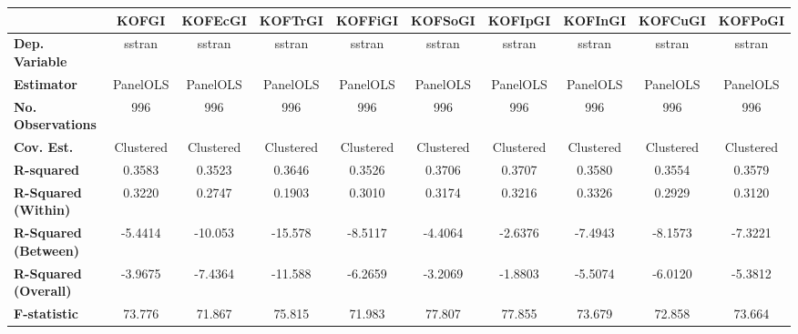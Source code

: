 \begin{center}
\begin{tabular}{lccccccccc}
\toprule
                                   & \textbf{KOFGI} & \textbf{KOFEcGI} & \textbf{KOFTrGI} & \textbf{KOFFiGI} & \textbf{KOFSoGI} & \textbf{KOFIpGI} & \textbf{KOFInGI} & \textbf{KOFCuGI} & \textbf{KOFPoGI}  \\
\midrule
\textbf{Dep. Variable}             &     sstran     &      sstran      &      sstran      &      sstran      &      sstran      &      sstran      &      sstran      &      sstran      &      sstran       \\
\textbf{Estimator}                 &    PanelOLS    &     PanelOLS     &     PanelOLS     &     PanelOLS     &     PanelOLS     &     PanelOLS     &     PanelOLS     &     PanelOLS     &     PanelOLS      \\
\textbf{No. Observations}          &      996       &       996        &       996        &       996        &       996        &       996        &       996        &       996        &       996         \\
\textbf{Cov. Est.}                 &   Clustered    &    Clustered     &    Clustered     &    Clustered     &    Clustered     &    Clustered     &    Clustered     &    Clustered     &    Clustered      \\
\textbf{R-squared}                 &     0.3583     &      0.3523      &      0.3646      &      0.3526      &      0.3706      &      0.3707      &      0.3580      &      0.3554      &      0.3579       \\
\textbf{R-Squared (Within)}        &     0.3220     &      0.2747      &      0.1903      &      0.3010      &      0.3174      &      0.3216      &      0.3326      &      0.2929      &      0.3120       \\
\textbf{R-Squared (Between)}       &    -5.4414     &     -10.053      &     -15.578      &     -8.5117      &     -4.4064      &     -2.6376      &     -7.4943      &     -8.1573      &     -7.3221       \\
\textbf{R-Squared (Overall)}       &    -3.9675     &     -7.4364      &     -11.588      &     -6.2659      &     -3.2069      &     -1.8803      &     -5.5074      &     -6.0120      &     -5.3812       \\
\textbf{F-statistic}               &     73.776     &      71.867      &      75.815      &      71.983      &      77.807      &      77.855      &      73.679      &      72.858      &      73.664       \\

\end{tabular}
\end{center}
